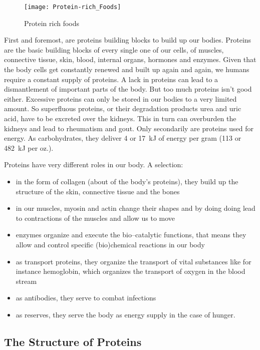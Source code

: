 \documentclass[../main.tex]{subfiles}
\begin{document}
\begin{figure}[htb!]
\centering
  \texttt{[image: Protein-rich\_Foods]}
  \caption{Protein rich foods\cite{Proteins}}
\end{figure}

First and foremost, are proteins building blocks to build up our bodies.
Proteins are the basic building blocks of every single one of our cells, of muscles, connective tissue, skin,
blood, internal organs, hormones and enzymes.
Given that the body cells get constantly renewed and built up again and again, we humans require a constant supply of proteins.
A lack in proteins can lead to a dismantlement of important parts of the body.
But too much proteins isn't good either.
Excessive proteins can only be stored in our bodies to a very limited amount.
So superfluous proteins, or their degradation products urea and uric acid, have to be excreted over the kidneys.
This in turn can overburden the kidneys and lead to rheumatism and gout.
Only secondarily are proteins used for energy.
As carbohydrates, they deliver \SI{4}{\kcal} or \SI{17}{\kJ} of energy per gram (\SI{113}{\kcal} or \SI{482}{\kJ} per oz.).

Proteins have very different roles in our body. A selection:
\begin{itemize}
\item in the form of collagen (about  of the body's proteins), they build up the structure of the skin, connective tissue and the bones
\item in our muscles, myosin and actin change their shapes and by doing doing lead to contractions of the muscles and allow us to move
\item enzymes organize and execute the bio--catalytic functions, that means they allow  and control specific (bio)chemical reactions in our body
\item as transport proteins, they organize the transport of vital substances like for instance hemoglobin, which organizes the transport of oxygen in the blood stream
\item as antibodies, they serve to combat infections
  \item as reserves, they serve the body as energy supply in the case of hunger.
  \end{itemize}

  \subsection{The Structure of Proteins}
\end{document}
